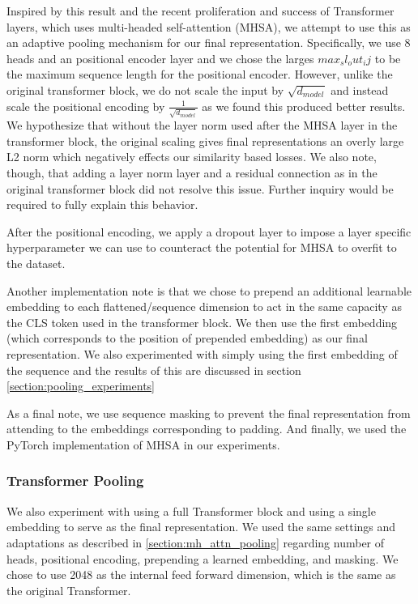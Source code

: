 Inspired by this result and the recent proliferation and success of Transformer layers, which uses multi-headed self-attention (MHSA), we attempt to use this as an adaptive pooling mechanism for our final representation.
Specifically, we use 8 heads and an positional encoder layer and we chose the larges $max_sl_out_ij$ to be the maximum sequence length for the positional encoder.
However, unlike the original transformer block, we do not scale the input by $\sqrt{d_{model}}$ and instead scale the positional encoding by $\frac{1}{\sqrt{d_{model}}}$  as we found this produced better results.
We hypothesize that without the layer norm used after the MHSA layer in the transformer block, the original scaling gives final representations an overly large L2 norm which negatively effects our similarity based losses.
We also note, though, that adding a layer norm layer and a residual connection as in the original transformer block did not resolve this issue.
Further inquiry would be required to fully explain this behavior.

After the positional encoding, we apply a dropout layer to impose a layer specific hyperparameter we can use to counteract the potential for MHSA to overfit to the dataset.

Another implementation note is that we chose to prepend an additional learnable embedding to each flattened/sequence dimension to act in the same capacity as the CLS token used in the transformer block.
We then use the first embedding (which corresponds to the position of prepended embedding) as our final representation.
We also experimented with simply using the first embedding of the sequence and the results of this are discussed in section \ref{section:pooling_experiments}

As a final note, we use sequence masking to prevent the final representation from attending to the embeddings corresponding to padding.
And finally, we used the PyTorch implementation of MHSA in our experiments.

\subsubsection{Transformer Pooling}
\label{section:transformer_pooling}
We also experiment with using a full Transformer block and using a single embedding to serve as the final representation. 
We used the same settings and adaptations as described in \ref{section:mh_attn_pooling} regarding number of heads, positional encoding, prepending a learned embedding, and masking.
We chose to use 2048 as the internal feed forward dimension, which is the same as the original Transformer.


